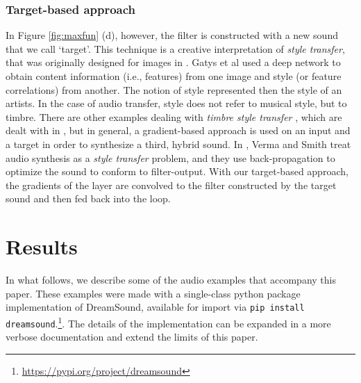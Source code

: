 \documentclass[a4paper,10pt,oneside]{article}
\begin{document}
\begin{sloppy}
\subsubsection{Target-based approach}
In Figure \ref{fig:maxfun} (d), however, the filter is constructed with a new sound that we call `target'. This technique is a creative interpretation of \textit{style transfer}, that was originally designed for images in \cite{GatysEB15a}. Gatys et al used a deep network to obtain content information (i.e., features) from one image and style (or feature correlations) from another. The notion of style represented then the style of an artists. In the case of audio transfer, style does not refer to musical style, but to timbre. There are other examples dealing with \textit{timbre style transfer} \cite{Foote2016, Ulyanov2016, Wyse2017}, which are dealt with in \cite{Briot2017}, but in general, a gradient-based approach is used on an input and a target in order to synthesize a third, hybrid sound. In \cite{verma2018neural}, Verma and Smith treat audio synthesis as a \textit{style transfer} problem, and they use back-propagation to optimize the sound to conform to filter-output. With our target-based approach, the gradients of the layer are convolved to the filter constructed by the target sound and then fed back into the loop. 




\section{Results}

In what follows, we describe some of the audio examples that accompany this paper. These examples were made with a single-class python package implementation of DreamSound, available for import via \texttt{pip install dreamsound}.\footnote{\url{https://pypi.org/project/dreamsound}}. The details of the implementation can be expanded in a more verbose documentation and extend the limits of this paper. 




\end{sloppy}
\end{document}
